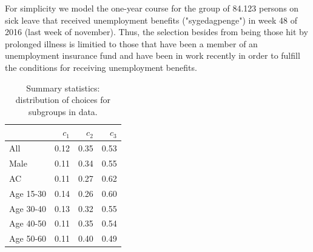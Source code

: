 For simplicity we model the one-year course for the group of 84.123 persons on sick leave that received unemployment benefits ("sygedagpenge") in week 48 of 2016 (last week of november). Thus, the selection besides from being those hit by prolonged illness is limitied to those that have been a member of an unemployment insurance fund and have been in work recently in order to fulfill the conditions for receiving unemployment benefits.

\begin{table}
  \centering
\begin{tabular}{lrrr}
\toprule
{} &         $c_1$ &         $c_2$ &         $c_3$ \\
\midrule
All       &  0.12 &  0.35 &  0.53 \\
Male      &  0.11 &  0.34 &  0.55 \\
AC        &  0.11 &  0.27 &  0.62 \\
Age 15-30 &  0.14 &  0.26 &  0.60 \\
Age 30-40 &  0.13 &  0.32 &  0.55 \\
Age 40-50 &  0.11 &  0.35 &  0.54 \\
Age 50-60 &  0.11 &  0.40 &  0.49 \\
\bottomrule
\end{tabular}
\caption{Summary statistics: distribution of choices for subgroups in data.}
\label{tab:sumstats}
\end{table}


